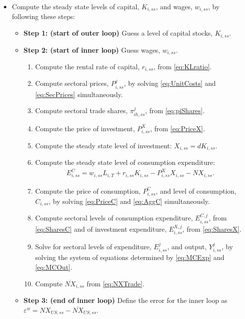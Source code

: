 \documentclass{article}
\begin{document}
\begin{itemize}
    \item Compute the steady state levels of capital, $K_{i,ss}$, and wages, $w_{i,ss}$, by following these steps:
    \begin{itemize}
        \item \textbf{Step 1: (start of outer loop)} Guess a level of capital stocks, $K_{i,ss}$.
        \item \textbf{Step 2: (start of inner loop)} Guess wages, $w_{i,ss}$.
        \begin{enumerate}
            \item Compute the rental rate of capital, $r_{i,ss}$, from \eqref{eq:KLratio}.
            \item Compute sectoral prices, $P_{i,ss}^{j}$, by solving \eqref{eq:UnitCosts} and \eqref{eq:SecPrices} simultaneously.
            \item Compute sectoral trade shares, $\pi_{ih,ss}^{j}$, from \eqref{eq:piShares}.
            \item Compute the price of investment, $P_{i,ss}^{X}$, from \eqref{eq:PriceX}.
            \item Compute the steady state level of investment: $X_{i,ss} = d K_{i,ss}$.
            \item Compute the steady state level of consumption expenditure:
            \begin{align*}
                E_{i,ss}^{C} = w_{i,ss}L_{i,T} + r_{i,ss}K_{i,ss} - P^X_{i,ss}X_{i,ss} - NX_{i,ss}.
            \end{align*}
            \item Compute the price of consumption, $P_{i,ss}^{C}$, and level of consumption, $C_{i,ss}$, by solving \eqref{eq:PriceC} and \eqref{eq:AggC} simultaneously.
            \item Compute sectoral levels of consumption expenditure, $E_{i,ss}^{C,j}$, from \eqref{eq:SharesC} and of investment expenditure, $E_{i,ss}^{X,j}$, from \eqref{eq:SharesX}.
            \item Solve for sectoral levels of expenditure, $E_{i,ss}^{j}$, and output, $Y_{i,ss}^{j}$, by solving the system of equations determined by \eqref{eq:MCExp} and \eqref{eq:MCOut}.
            \item Compute $\overline{NX}_{i,ss}$ from \eqref{eq:NXTrade}.
        \end{enumerate}
        \item \textbf{Step 3: (end of inner loop)} Define the error for the inner loop as $\varepsilon^{w} =  NX_{US,ss} - \overline{NX}_{US,ss}$.

\end{itemize}
\end{itemize}
\end{document}
